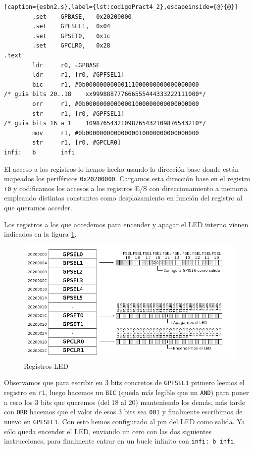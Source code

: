 \begin{lstlisting}[caption={esbn2.s},label={lst:codigoPract4_2},escapeinside={@}{@}]
        .set    GPBASE,   0x20200000
        .set    GPFSEL1,  0x04
        .set    GPSET0,   0x1c
        .set    GPCLR0,   0x28
.text
        ldr     r0, =GPBASE
        ldr     r1, [r0, #GPFSEL1]
        bic     r1, #0b00000000000111000000000000000000
/* guia bits 20..18    xx999888777666555444333222111000*/
        orr     r1, #0b00000000000001000000000000000000
        str     r1, [r0, #GPFSEL1]
/* guia bits 16 a 1    10987654321098765432109876543210*/
        mov     r1, #0b00000000000000010000000000000000
        str     r1, [r0, #GPCLR0]
infi:   b       infi
\end{lstlisting}

El acceso a los registros lo hemos hecho usando la dirección base donde
están mapeados los periféricos {\tt 0x20200000}. Cargamos esta dirección
base en el registro {\tt r0} y codificamos los accesos a los registros
E/S con direccionamiento a memoria empleando distintas constantes como
desplazamiento en función del registro al que queramos acceder.

Los registros a los que accedemos para encender y apagar el LED interno vienen indicados
en la figura \ref{fig:gpio1}.

\begin{figure}[h]
  \centering
    \includegraphics[width=14cm]{graphs/gpio1.png}
  \caption{Registros LED}
  \label{fig:gpio1}
\end{figure}

Observamos que para escribir en 3 bits concretos de {\tt GPFSEL1} primero leemos
el registro en {\tt r1}, luego hacemos un {\tt BIC} (queda más legible que un {\tt AND})
para poner a cero los 3 bits que queremos (del 18 al 20) manteniendo los demás,
más tarde con {\tt ORR} hacemos que el valor de esos 3 bits sea {\tt 001} y finalmente
escribimos de nuevo en {\tt GPFSEL1}. Con esto hemos configurado al pin del LED como salida.
Ya sólo queda encender el LED, enviando un cero con las dos siguientes instrucciones, para
finalmente entrar en un bucle infinito con {\tt infi: b infi}.

